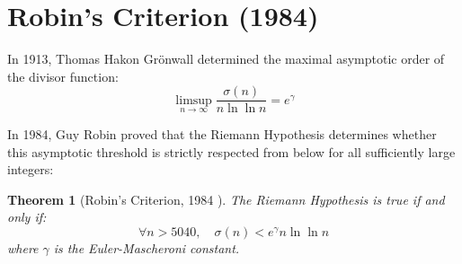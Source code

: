 \documentclass[11pt,a4paper]{article}
\newtheorem{theorem}{Theorem}[section]
\theoremstyle{definition}
\begin{document}
\section{Robin's Criterion (1984)}

In 1913, Thomas Hakon Gr\"onwall \cite{gronwall1913} determined the maximal asymptotic order of the divisor function:
\begin{equation}\label{eq:gronwall}
\limsup_{n \to \infty} \frac{\sigma(n)}{n \ln\ln n} = e^\gamma
\end{equation}

In 1984, Guy Robin \cite{robin1984} proved that the Riemann Hypothesis determines whether this asymptotic threshold is strictly respected from below for all sufficiently large integers:

\begin{theorem}[Robin's Criterion, 1984 \cite{robin1984}]\label{thm:robin}
The Riemann Hypothesis is true if and only if:
\begin{equation}\label{eq:robin_ineq}
\forall n > 5040, \quad \sigma(n) < e^\gamma n \ln\ln n
\end{equation}
where $\gamma$ is the Euler-Mascheroni constant.
\end{theorem}
\end{document}
